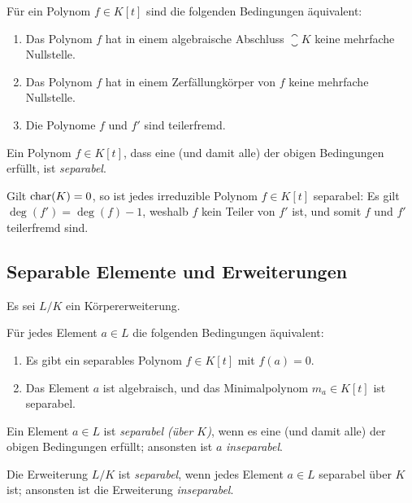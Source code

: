 \begin{corollary}
  Für ein Polynom $f \in K[t]$ sind die folgenden Bedingungen äquivalent:
  \begin{enumerate}
    \item
      Das Polynom $f$ hat in einem algebraische Abschluss $\closure{K}$ keine mehrfache Nullstelle.
    \item
      Das Polynom $f$ hat in einem Zerfällungkörper von $f$ keine mehrfache Nullstelle.
    \item
      Die Polynome $f$ und $f'$ sind teilerfremd.
  \end{enumerate}
\end{corollary}

\begin{definition}
  Ein Polynom $f \in K[t]$, dass eine \textup(und damit alle\textup) der obigen Bedingungen erfüllt, ist \emph{separabel}.
\end{definition}

\begin{example}
  Gilt $\operatorname{char}(K) = 0$, so ist jedes irreduzible Polynom $f \in K[t]$ separabel:
  Es gilt $\deg(f') = \deg(f)-1$, weshalb $f$ kein Teiler von $f'$ ist, und somit $f$ und $f'$ teilerfremd sind.
\end{example}






\subsection{Separable Elemente und Erweiterungen}

Es sei $L/K$ ein Körpererweiterung.

\begin{lemma}
  Für jedes Element $a \in L$ die folgenden Bedingungen äquivalent:
  \begin{enumerate}
    \item
      Es gibt ein separables Polynom $f \in K[t]$ mit $f(a) = 0$.
    \item
      Das Element $a$ ist algebraisch, und das Minimalpolynom $m_a \in K[t]$ ist separabel.
  \end{enumerate}
\end{lemma}

\begin{definition}
  Ein Element $a \in L$ ist \emph{separabel \textup(über $K$\textup)}, wenn es eine \textup(und damit alle\textup) der obigen Bedingungen erfüllt;
  ansonsten ist $a$ \emph{inseparabel}.
  
  Die Erweiterung $L/K$ ist \emph{separabel}, wenn jedes Element $a \in L$ separabel über $K$ ist;
  ansonsten ist die Erweiterung \emph{inseparabel}.
\end{definition}

